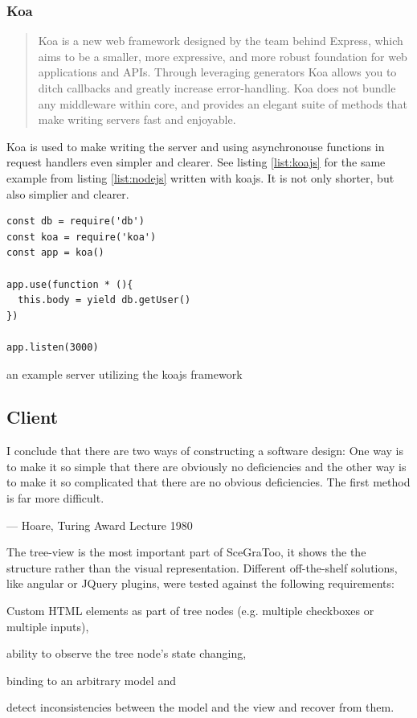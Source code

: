 \subsubsection{Koa}
\label{par:Koa}
\begin{quote}
  Koa is a new web framework designed by the team behind Express, which aims to be a smaller, more expressive, and more robust foundation for web applications and APIs. Through leveraging generators Koa allows you to ditch callbacks and greatly increase error-handling. Koa does not bundle any middleware within core, and provides an elegant suite of methods that make writing servers fast and enjoyable. \cite{koajs}
\end{quote}

Koa is used to make writing the server and using asynchronouse functions in request handlers even simpler and clearer.
See listing \ref{list:koajs} for the same example from listing \ref{list:nodejs} written with koajs.
It is not only shorter, but also simplier and clearer.

\begin{listing}
  \begin{verbatim}
const db = require('db')
const koa = require('koa')
const app = koa()

app.use(function * (){
  this.body = yield db.getUser()
})

app.listen(3000)
  \end{verbatim}
  \caption{an example server utilizing the koajs framework}
  \label{list:koajs}
\end{listing}

\subsection{Client}
\label{client}

\epigraph{I conclude that there are two ways of constructing a software design:
One way is to make it so simple that there are obviously no deficiencies
and the other way is to make it so complicated that there are no obvious
deficiencies. The first method is far more difficult.}{--- Hoare, Turing Award Lecture 1980}

The tree-view is the most important part of SceGraToo, it shows the
the structure rather than the visual representation. Different
off-the-shelf solutions, like angular or JQuery plugins, were tested
against the following requirements:

\begin{enumerate*}
  \item Custom \gls{HTML} elements as part of tree nodes (e.g. multiple checkboxes or multiple inputs),
  \item ability to observe the tree node's state changing,
  \item binding to an arbitrary model and
  \item detect inconsistencies between the model and the view and recover from them.
\end{enumerate*}

